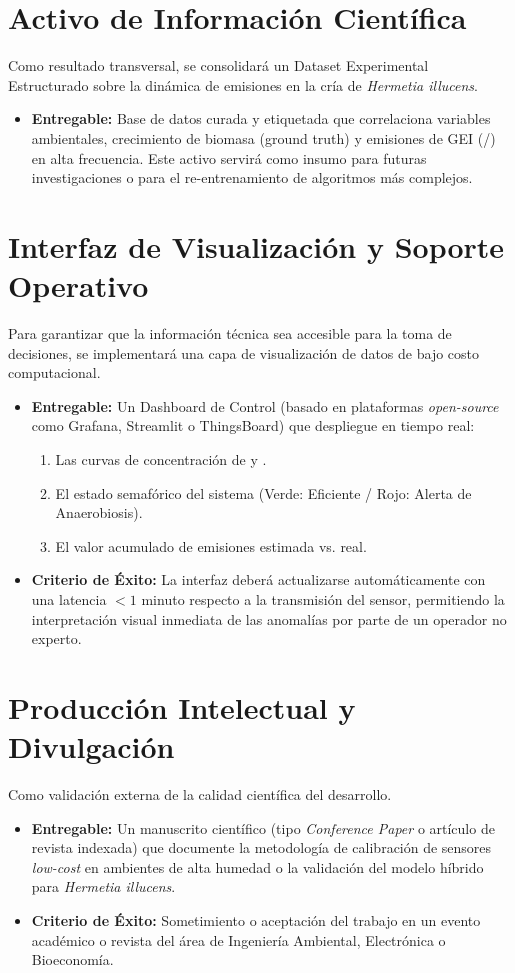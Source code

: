 \section{Activo de Información Científica}Como resultado transversal, se consolidará un Dataset Experimental Estructurado sobre la dinámica de emisiones en la cría de \textit{Hermetia illucens}.\begin{itemize}\item \textbf{Entregable:} Base de datos curada y etiquetada que correlaciona variables ambientales, crecimiento de biomasa (ground truth) y emisiones de GEI (/) en alta frecuencia. Este activo servirá como insumo para futuras investigaciones o para el re-entrenamiento de algoritmos más complejos.\end{itemize}


\section{Interfaz de Visualización y Soporte Operativo}Para garantizar que la información técnica sea accesible para la toma de decisiones, se implementará una capa de visualización de datos de bajo costo computacional.\begin{itemize}\item \textbf{Entregable:} Un Dashboard de Control (basado en plataformas \textit{open-source} como Grafana, Streamlit o ThingsBoard) que despliegue en tiempo real:\begin{enumerate}\item Las curvas de concentración de  y .\item El estado semafórico del sistema (Verde: Eficiente / Rojo: Alerta de Anaerobiosis).\item El valor acumulado de emisiones estimada vs. real.\end{enumerate}\item \textbf{Criterio de Éxito:} La interfaz deberá actualizarse automáticamente con una latencia $< 1$ minuto respecto a la transmisión del sensor, permitiendo la interpretación visual inmediata de las anomalías por parte de un operador no experto.\end{itemize}

\section{Producción Intelectual y Divulgación}Como validación externa de la calidad científica del desarrollo.\begin{itemize}\item \textbf{Entregable:} Un manuscrito científico (tipo \textit{Conference Paper} o artículo de revista indexada) que documente la metodología de calibración de sensores \textit{low-cost} en ambientes de alta humedad o la validación del modelo híbrido para \textit{Hermetia illucens}.\item \textbf{Criterio de Éxito:} Sometimiento o aceptación del trabajo en un evento académico o revista del área de Ingeniería Ambiental, Electrónica o Bioeconomía.\end{itemize}
